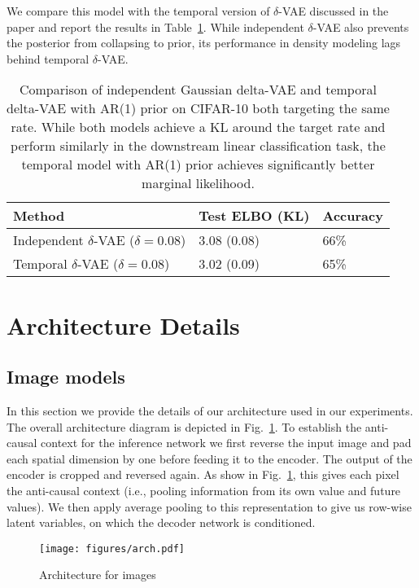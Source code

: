 \documentclass{article} \usepackage{iclr2019_conference,times}
\def\figref#1{figure~\ref{#1}}
\renewcommand{\figref}[1]{Fig.~\ref{#1}}
\newcommand{\tblref}[1]{Table~\ref{#1}}
\begin{document}
We compare this model with the temporal version of $\delta$-VAE discussed in the paper and report the results in \tblref{tbl:indep-ablation}. While independent $\delta$-VAE also prevents the posterior from collapsing to prior, its performance in density modeling lags behind temporal $\delta$-VAE. 

\begin{table}[h]
    \centering
    \begin{tabular}{l|ll}
        \textbf{Method} &  Test ELBO (KL)     &  Accuracy  \\
        \toprule
         Independent $\delta$-VAE  ($\delta=0.08$) & 3.08 (0.08) & 66\% \\
         Temporal $\delta$-VAE  ($\delta=0.08$) & 3.02 (0.09)    & 65\% \\
         \bottomrule
    \end{tabular}
    \caption{Comparison of independent Gaussian delta-VAE and temporal delta-VAE with AR(1) prior on CIFAR-10 both targeting the same rate. While both models achieve a KL around the target rate and perform similarly in the downstream linear classification task, the temporal model with AR(1) prior achieves significantly better marginal likelihood.}
    \label{tbl:indep-ablation}
\end{table}

\section{Architecture Details}\label{app:arch}

\subsection{Image models}

In this section we provide the details of our architecture used in our experiments. The overall architecture diagram is depicted in
\figref{fig:arch}. To establish the anti-causal context for the inference network we first reverse the input image and pad each spatial dimension by one before feeding it to the encoder. The output of the encoder is cropped and reversed again. As show in \figref{fig:arch}, this gives each pixel the anti-causal context (i.e., pooling information from its own value and future values). We then apply average pooling to this representation to give us row-wise latent variables, on which the decoder network is conditioned. 

\begin{figure}[h]
    \centering
    \texttt{[image: figures/arch.pdf]}
    \caption{Architecture for images}
    \label{fig:arch}
\end{figure}
\end{document}
